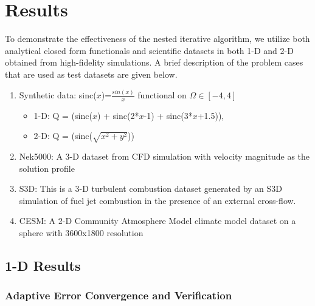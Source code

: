 
\section{Results}
\label{sec:results}

To demonstrate the effectiveness of the nested iterative algorithm, we utilize both analytical closed form functionals and scientific datasets in both 1-D and 2-D obtained from high-fidelity simulations. A brief description of the problem cases that are used as test datasets are given below.

\begin{enumerate}
	\item Synthetic data: sinc($x$)=$\frac{sin(x)}{x}$ functional on $\Omega \in [-4, 4]$
	\begin{itemize}
		\item 1-D: Q = (sinc($x$) + sinc(2*$x$-1) + sinc(3*$x$+1.5)), 
		\item 2-D: Q = (sinc($\sqrt{x^2+y^2}$))
	\end{itemize}
	\item Nek5000: A 3-D dataset from CFD simulation with velocity magnitude as the solution profile
	\item S3D: This is a 3-D turbulent combustion dataset generated by an S3D simulation \cite{chen-s3d-2009} of fuel jet combustion in the presence of an external cross-flow. 
	\item CESM: A 2-D Community Atmosphere Model climate model dataset on a sphere with 3600x1800 resolution
\end{enumerate}


\subsection{1-D Results}\label{AA}


\subsubsection{Adaptive Error Convergence and Verification}

